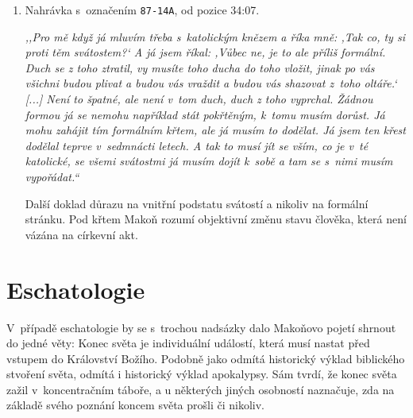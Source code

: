 \begin{enumerate}
{Zde opět typičtější Makoňův přístup. Výpověď, že svátost má vést k~poznání,
        považuji za nesamozřejmou.

}

\item{
Nahrávka s~označením \texttt{87-14A}, od pozice 34:07.

\textit{%
,,Pro mě když já mluvím třeba s~katolickým knězem a říka mně: ,Tak co, ty si
proti těm svátostem?{}` A já jsem říkal: ,Vůbec ne, je to ale příliš formální.
Duch se z toho ztratil, vy musíte toho ducha do toho vložit, jinak po vás
všichni budou plivat a budou vás vraždit a budou vás shazovat z~toho oltáře.`
[...] %
Není to špatné, ale není v~tom duch, duch z toho vyprchal. Žádnou formou já se
nemohu například stát pokřtěným, k~tomu musím dorůst. Já mohu zahájit tím
formálním křtem, ale já musím to dodělat. Já jsem ten křest dodělal teprve
v~sedmnácti letech. A tak to musí jít se vším, co je v~té katolické, se všemi
svátostmi já musím dojít k~sobě a tam se s~nimi musím vypořádat.``
}

Další doklad důrazu na vnitřní podstatu svátostí a nikoliv na formální stránku.
Pod křtem Makoň rozumí objektivní změnu stavu člověka, která není vázána na
církevní akt.

}

\end{enumerate}

\section{Eschatologie}

V~případě eschatologie by se s~trochou nadsázky dalo Makoňovo pojetí shrnout do
jedné věty: Konec světa je individuální událostí, která musí nastat před vstupem
do Království Božího. Podobně jako odmítá historický výklad biblického stvoření
světa, odmítá i historický výklad apokalypsy. Sám tvrdí, že konec světa zažil
v~koncentračním táboře, a u některých jiných osobností naznačuje, zda na základě
svého poznání koncem světa prošli či nikoliv.

